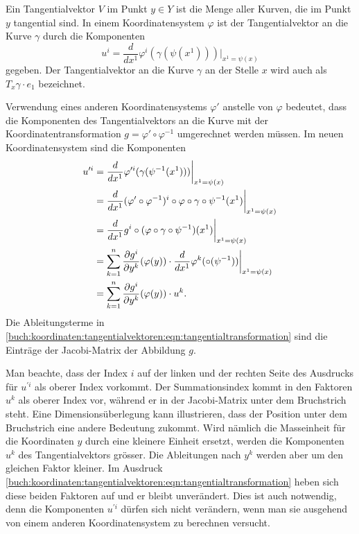 \begin{definition}[Tangentialvektor]
\label{buch:koordinaten:tangentialvektoren:def:tangentialvektor}
Ein Tangentialvektor $V$ im Punkt $y\in Y$ ist die Menge aller Kurven, die
im Punkt $y$ tangential sind.
In einem Koordinatensystem $\varphi$ ist der Tangentialvektor an die Kurve
$\gamma$ durch die Komponenten
\[
u^i
=
\frac{d}{dx^1} \varphi^i(\gamma(\psi(x^1))) \bigg|_{x^1 = \psi(x)}
\]
gegeben.
Der Tangentialvektor an die Kurve $\gamma$ an der Stelle $x$
wird auch als $T_x\gamma\cdot e_1$ bezeichnet.
\end{definition}

Verwendung eines anderen Koordinatensystems $\varphi'$ anstelle von
$\varphi$ bedeutet, dass die Komponenten des Tangentialvektors
an die Kurve mit der Koordinatentransformation
$g=\varphi'\circ\varphi^{-1}$ umgerechnet werden müssen.
Im neuen Koordinatensystem sind die Komponenten
\begin{align}
u^{\prime i}
&=
\frac{d}{dx^1}
\varphi^{\prime i}(\gamma(\psi^{-1}(x^1))) \bigg|_{x^1=\psi(x)}
\notag
\\
&=
\frac{d}{dx^1}
(\varphi'\circ\varphi^{-1})^i\circ \varphi\circ\gamma\circ\psi^{-1}(x^1)
\bigg|_{x^1=\psi(x)}
\notag
\\
&=
\frac{d}{dx^1} g^i\circ(\varphi\circ\gamma\circ\psi^{-1})(x^1)
\bigg|_{x^1=\psi(x)}
\notag
\\
&=
\sum_{k=1}^n
\frac{\partial g^i}{\partial y^k}(\varphi(y))
\cdot
\frac{d}{dx^1}\varphi^k(\circ(\psi^{-1})) 
\bigg|_{x^1=\psi(x)}
\notag
\\
&=
\sum_{k=1}^n
\frac{\partial g^i}{\partial y^k}(\varphi(y))
\cdot
u^k.
\label{buch:koordinaten:tangentialvektoren:eqn:tangentialtransformation}
\end{align}
Die Ableitungsterme in
\eqref{buch:koordinaten:tangentialvektoren:eqn:tangentialtransformation}
sind die Einträge der Jacobi-Matrix der Abbildung $g$.

Man beachte, dass der Index $i$ auf der linken und der rechten 
Seite des Ausdrucks für $u^{\prime i}$ als oberer Index vorkommt.
Der Summationsindex kommt in den Faktoren $u^k$ als oberer Index
vor, während er in der Jacobi-Matrix unter dem Bruchstrich steht.
Eine Dimensionsüberlegung kann illustrieren, dass der Position unter
dem Bruchstrich eine andere Bedeutung zukommt.
Wird nämlich die Masseinheit für die Koordinaten $y$ durch eine kleinere
Einheit ersetzt, werden die Komponenten $u^k$ des Tangentialvektors
grösser.
Die Ableitungen nach $y^k$ werden aber um den gleichen Faktor kleiner.
Im Ausdruck 
\eqref{buch:koordinaten:tangentialvektoren:eqn:tangentialtransformation}
heben sich diese beiden Faktoren auf und er bleibt unverändert.
Dies ist auch notwendig, denn die Komponenten $u^{\prime i}$ dürfen
sich nicht verändern, wenn man sie ausgehend von einem anderen
Koordinatensystem zu berechnen versucht.

